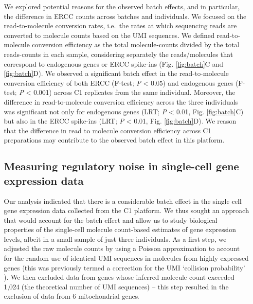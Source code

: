 We explored potential reasons for the observed batch effects, and in
particular, the difference in ERCC counts across batches and
individuals. We focused on the read-to-molecule conversion rates,
i.e.~the rates at which sequencing reads are converted to molecule
counts based on the UMI sequences. We defined read-to-molecule
conversion efficiency as the total molecule-counts divided by the
total reads-counts in each sample, considering separately the
reads/molecules that correspond to endogenous genes or ERCC spike-ins
(Fig. \ref{fig:batch}C and \ref{fig:batch}D).  We observed a
significant batch effect in the read-to-molecule conversion efficiency
of both ERCC (F-test; \emph{P} \textless{} 0.05) and endogenous genes
(F-test; \emph{P} \textless{} 0.001) across C1 replicates from the
same individual. Moreover, the difference in read-to-molecule
conversion efficiency across the three individuals was significant not
only for endogenous genes (LRT; \emph{P} \textless{} 0.01,
Fig. \ref{fig:batch}C) but also in the ERCC spike-ins (LRT; \emph{P}
\textless{} 0.01, Fig. \ref{fig:batch}D). We reason that the
difference in read to molecule conversion efficiency across C1
preparations may contribute to the observed batch effect in this
platform.

\subsection{Measuring regulatory noise in single-cell gene expression
data}\label{measuring-regulatory-noise-in-single-cell-gene-expression-data}

Our analysis indicated that there is a considerable batch effect in
the single cell gene expression data collected from the C1
platform. We thus sought an approach that would account for the batch
effect and allow us to study biological properties of the single-cell
molecule count-based estimates of gene expression levels, albeit in a
small sample of just three individuals. As a first step, we adjusted
the raw molecule counts by using a Poisson approximation to account
for the random use of identical UMI sequences in molecules from highly
expressed genes (this was previously termed a correction for the UMI
`collision probability' \citep{Fu2011}). We then excluded data from
genes whose inferred molecule count exceeded 1,024 (the theoretical
number of UMI sequences) -- this step resulted in the exclusion of
data from 6 mitochondrial genes.

